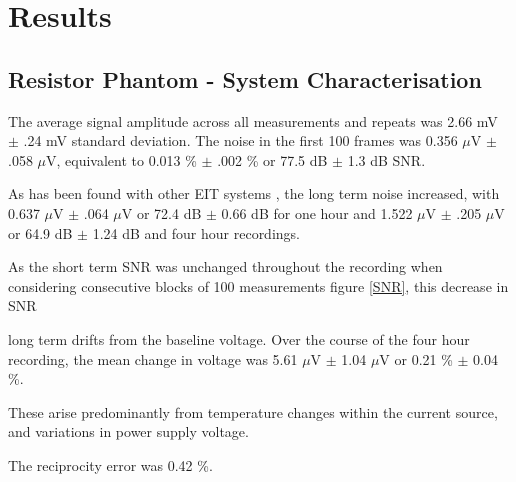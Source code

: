 \section{Results}
\subsection{Resistor Phantom - System Characterisation}
The average signal amplitude across all measurements and repeats was 2.66 mV $\pm$ .24 mV standard deviation. The noise in the first 100 frames was 0.356 $\mu$V $\pm$ .058 $\mu$V, equivalent to 0.013 \% $\pm$ .002 \% or 77.5 dB $\pm$ 1.3 dB SNR. 



As has been found with other EIT systems \cite{oh2007multi}, the long term noise increased, with 0.637 $\mu$V $\pm$ .064 $\mu$V or 72.4 dB $\pm$ 0.66 dB for one hour and 1.522 $\mu$V $\pm$ .205 $\mu$V or 64.9 dB $\pm$ 1.24 dB and four hour recordings.


As the short term SNR was unchanged throughout the recording when considering consecutive blocks of 100 measurements figure \ref{SNR}, this decrease in SNR 


long term drifts from the baseline voltage. Over the course of the four hour recording, the mean change in voltage was 5.61 $\mu$V $\pm$ 1.04 $\mu$V or 0.21 \% $\pm$ 0.04 \%. 


These arise predominantly from temperature changes within the current source, and variations in power supply voltage.

The reciprocity error was 0.42 \%. 
